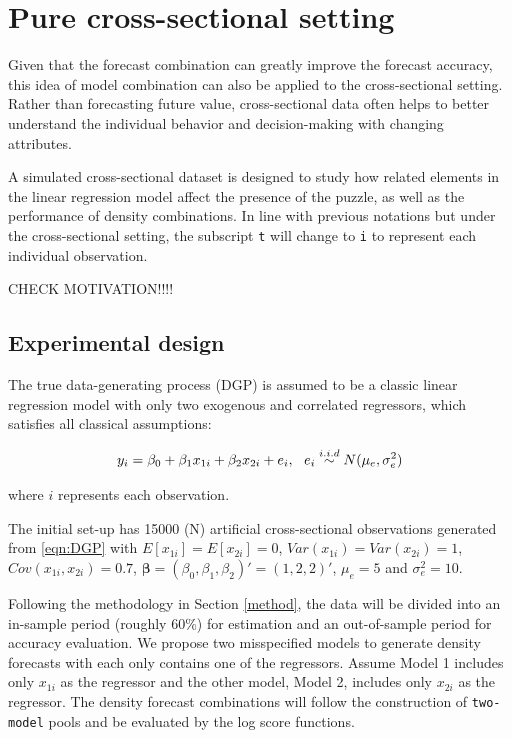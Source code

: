 \documentclass{monashthesis}
\begin{document}
\hypertarget{pure-cross-sectional-setting}{%
\section{Pure cross-sectional setting}\label{pure-cross-sectional-setting}}

Given that the forecast combination can greatly improve the forecast accuracy, this idea of model combination can also be applied to the cross-sectional setting. Rather than forecasting future value, cross-sectional data often helps to better understand the individual behavior and decision-making with changing attributes.

A simulated cross-sectional dataset is designed to study how related elements in the linear regression model affect the presence of the puzzle, as well as the performance of density combinations. In line with previous notations but under the cross-sectional setting, the subscript \texttt{t} will change to \texttt{i} to represent each individual observation.

CHECK MOTIVATION!!!!

\hypertarget{experimental-design}{%
\subsection{Experimental design}\label{experimental-design}}

The true data-generating process (DGP) is assumed to be a classic linear regression model with only two exogenous and correlated regressors, which satisfies all classical assumptions:

\begin{equation}
\label{eqn:DGP}
y_i = \beta_0 + \beta_1 x_{1i} + \beta_2 x_{2i} + e_i, \ \ e_i \stackrel{i.i.d}{\sim} N(\mu_e,\sigma^2_e) \\
\end{equation}

where \(i\) represents each observation.

The initial set-up has 15000 (N) artificial cross-sectional observations generated from \ref{eqn:DGP} with \(E[x_{1i}] = E[x_{2i}] = 0\), \(Var(x_{1i}) = Var(x_{2i}) = 1\), \(Cov(x_{1i}, x_{2i}) = 0.7\), \(\pmb{\beta} = (\beta_0, \beta_1, \beta_2)' = (1,2,2)'\), \(\mu_e = 5\) and \(\sigma^2_e=10\).

Following the methodology in Section \ref{method}, the data will be divided into an in-sample period (roughly 60\%) for estimation and an out-of-sample period for accuracy evaluation. We propose two misspecified models to generate density forecasts with each only contains one of the regressors. Assume Model 1 includes only \(x_{1i}\) as the regressor and the other model, Model 2, includes only \(x_{2i}\) as the regressor. The density forecast combinations will follow the construction of \texttt{two-model} pools and be evaluated by the log score functions.
\end{document}
